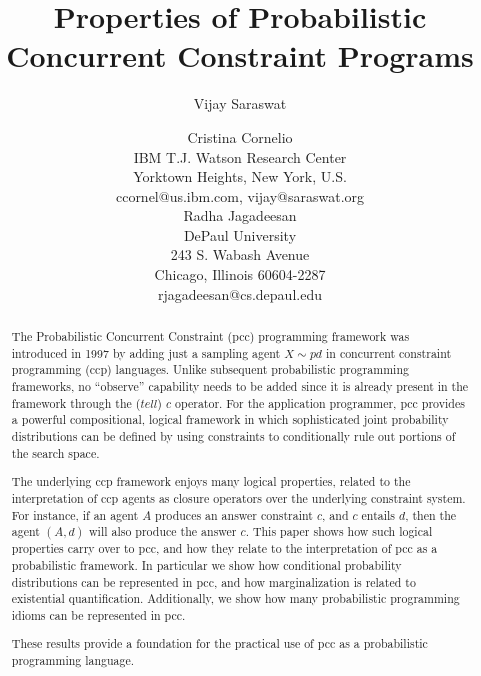 \documentclass[letterpaper]{article}
\theoremstyle{plain}
\theoremstyle{definition}
\theoremstyle{remark}
\theoremstyle{definition}
\begin{document}
%




\title{Properties of Probabilistic Concurrent Constraint Programs}
\author{Vijay Saraswat \and Cristina Cornelio\\
IBM T.J. Watson Research Center \\
Yorktown Heights, New York, U.S.\\
ccornel@us.ibm.com, vijay@saraswat.org\\
\And
Radha Jagadeesan\\
DePaul University\\
243 S. Wabash Avenue\\
Chicago, Illinois 60604-2287\\
rjagadeesan@cs.depaul.edu 
}
\maketitle
\begin{abstract}
The Probabilistic Concurrent Constraint (pcc) programming framework was introduced in 1997 by adding just a sampling agent $X\sim pd$ in concurrent constraint programming (ccp) languages. Unlike subsequent probabilistic programming frameworks, no ``observe'' capability needs to be added since it is already present in the framework through the (\(tell\)) \(c\) operator. For the application programmer, pcc provides a powerful compositional, logical framework in which sophisticated joint probability distributions can be defined by using constraints to conditionally rule out portions of the search space.

The underlying ccp framework enjoys many logical properties, related to the interpretation of ccp agents as closure operators over the underlying constraint system.  For instance, if an agent $A$ produces an answer constraint $c$, and $c$ entails $d$, then the agent $(A,d)$ will also produce the answer $c$. This paper shows how such logical properties carry over to pcc, and how they relate to the interpretation of pcc as a probabilistic framework. In particular we show how conditional probability distributions can be represented in pcc, and how marginalization is related to existential quantification.  Additionally, we show how many probabilistic programming idioms can be represented in pcc.

These results provide a foundation for the practical use of pcc as a probabilistic programming language.
\end{abstract}
\end{document}
